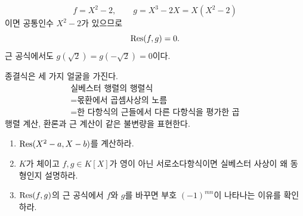 \begin{example}
\[
  f=X^2-2,
  \qquad
  g=X^3-2X=X(X^2-2)
\]
이면 공통인수 $X^2-2$가 있으므로
\[
  \operatorname{Res}(f,g)=0.
\]
근 공식에서도 $g(\sqrt2)=g(-\sqrt2)=0$이다.
\end{example}

\begin{keyidea}
종결식은 세 가지 얼굴을 가진다.
\[
  \boxed{
  \begin{array}{c}
  \text{실베스터 행렬의 행렬식}\\
  =\text{몫환에서 곱셈사상의 노름}\\
  =\text{한 다항식의 근들에서 다른 다항식을 평가한 곱}
  \end{array}}
\]
행렬 계산, 환론과 근 계산이 같은 불변량을 표현한다.
\end{keyidea}

\begin{checkpoint}
\begin{enumerate}[label=(\alph*)]
  \item $\operatorname{Res}(X^2-a,X-b)$를 계산하라.
  \item $K$가 체이고 $f,g\in K[X]$가 영이 아닌 서로소다항식이면 실베스터 사상이 왜 동형인지 설명하라.
  \item $\operatorname{Res}(f,g)$의 근 공식에서 $f$와 $g$를 바꾸면 부호 $(-1)^{mn}$이 나타나는 이유를 확인하라.
\end{enumerate}
\end{checkpoint}
